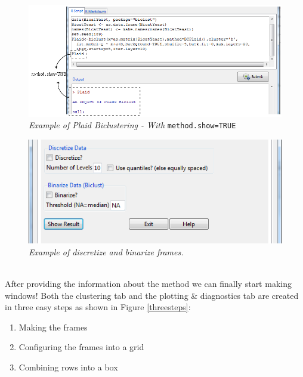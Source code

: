 \documentclass[a4paper]{article}\usepackage[]{graphicx}\usepackage[]{color}
\begin{document}
\begin{figure}[H]
\centering
\includegraphics[scale=0.5]{figures/showmethod.png}
\caption{{\it Example of Plaid Biclustering - With} \texttt{method.show=TRUE}
\label{showmethod}}
\end{figure}
\begin{figure}[H]
\centering
\includegraphics[scale=0.5]{figures/discrbin.png}
\caption{{\it Example of discretize and binarize frames.}
\label{discr.bin}}
\end{figure}

\newpage
{}\\
After providing the information about the method we can finally start making
windows! Both the clustering tab and the plotting \& diagnostics tab are created
in three easy steps as shown in Figure \ref{threesteps}:
\begin{enumerate}
\item Making the frames
\item Configuring the frames into a grid
\item Combining rows into a box

\end{enumerate}
\end{document}
